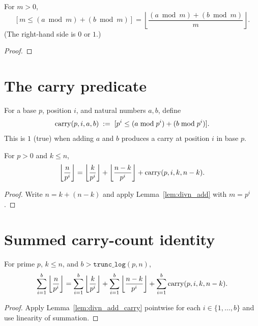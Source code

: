 \begin{lemma}
  \label{lem:carry_is_div}
  \rocqok
  For $m > 0$,
  \[
    [m \leq (a \bmod m) + (b \bmod m)]
    = \left\lfloor \frac{(a \bmod m) + (b \bmod m)}{m} \right\rfloor.
  \]
  (The right-hand side is $0$ or $1$.)
  \begin{proof}
    \rocqok
  \end{proof}
\end{lemma}

\section{The carry predicate}

\begin{definition}[Carry]
  \label{def:carry}
  \rocqok
  For a base $p$, position $i$, and natural numbers $a, b$, define
  \[
    \mathrm{carry}(p, i, a, b) \;:=\; [p^i \leq (a \bmod p^i) + (b \bmod p^i)].
  \]
  This is $1$ (true) when adding $a$ and $b$ produces a carry at
  position $i$ in base $p$.
\end{definition}

\begin{lemma}
  \label{lem:divn_add_carry}
  \rocqok
  For $p > 0$ and $k \leq n$,
  \[
    \left\lfloor \frac{n}{p^i} \right\rfloor
    = \left\lfloor \frac{k}{p^i} \right\rfloor
    + \left\lfloor \frac{n-k}{p^i} \right\rfloor
    + \mathrm{carry}(p, i, k, n-k).
  \]
  \begin{proof}
    \rocqok
    Write $n = k + (n-k)$ and apply Lemma~\ref{lem:divn_add} with $m = p^i$.
  \end{proof}
\end{lemma}

\section{Summed carry-count identity}

\begin{lemma}
  \label{lem:sum_divn_add_carry}
  \rocqok
  For prime $p$, $k \leq n$, and $b > \texttt{trunc\_log}(p, n)$,
  \[
    \sum_{i=1}^{b} \left\lfloor \frac{n}{p^i} \right\rfloor
    = \sum_{i=1}^{b} \left\lfloor \frac{k}{p^i} \right\rfloor
    + \sum_{i=1}^{b} \left\lfloor \frac{n-k}{p^i} \right\rfloor
    + \sum_{i=1}^{b} \mathrm{carry}(p, i, k, n-k).
  \]
  \begin{proof}
    \rocqok
    Apply Lemma~\ref{lem:divn_add_carry} pointwise for each
    $i \in \{1, \ldots, b\}$ and use linearity of summation.
  \end{proof}
\end{lemma}
